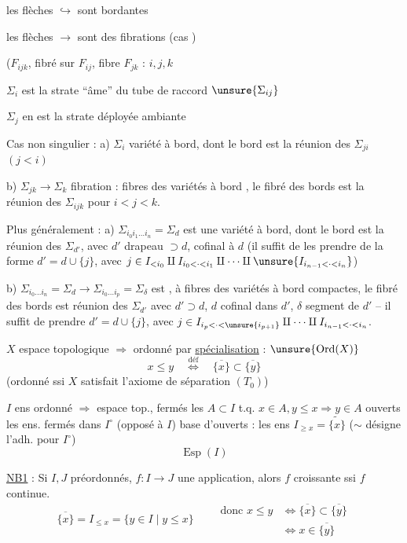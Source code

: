 les flèches $\hookrightarrow$ sont bordantes

les flèches $\longrightarrow$ sont des fibrations 
(cas )

($F_{ijk}$, fibré sur $F_{ij}$, fibre $F_{jk}$ : 
 $i,j,k$

$\Sigma_i$ est la strate  ``âme'' du tube de raccord $\unsure{\Sigma_{ij}}$

$\Sigma_j$ en est la strate déployée ambiante

Cas non singulier : a) $\Sigma_i$ variété à bord, dont le bord est
la réunion des $\Sigma_{ji}$ $(j<i)$

b) $\Sigma_{jk}\longrightarrow\Sigma_k$ fibration : fibres des
variétés à bord , le fibré des bords est
la réunion des $\Sigma_{ijk}$ pour $i<j<k$.

Plus généralement : a) $\Sigma_{i_0i_1\ldots i_n}=\Sigma_d$ est une
variété à bord, dont le bord est la réunion des
$\Sigma_{d'}$, avec $d'$ drapeau $\supset d$, cofinal à $d$
(il suffit de les prendre de la forme $d'=d\cup\{j\}$,
avec $j\in I_{<i_0}\amalg I_{i_0<\cdot<i_1}\amalg\cdots\amalg\unsure{I_{i_{n-1}<\cdot<i_n}}$)

b) $\Sigma_{i_0\ldots i_n}=\Sigma_d\longrightarrow\Sigma_{i_0\ldots i_p}=\Sigma_\delta$
est , à fibres des variétés à bord compactes,
le fibré des bords est réunion des $\Sigma_{d'}$
avec $d'\supset d$, $d$ cofinal dans $d'$, $\delta$ segment 
de $d'$ -- il suffit de prendre $d'=d\cup\{j\}$, avec
$j\in I_{i_p<\cdot<\unsure{i_{p+1}}}\amalg\cdots\amalg I_{i_{n-1}<\cdot<i_n}$.



$X$ espace topologique $\Longrightarrow$ ordonné par \uline{spécialisation} : $\unsure{\operatorname{Ord}(X)}$
\[
x\leq y\quad\overset{\mathrm{déf}}{\Longleftrightarrow}\quad\overline{\{x\}}\subset\overline{\{y\}}
\]
(ordonné ssi $X$ satisfait l'axiome de séparation $(T_0)$)

$I$ ens ordonné $\Longrightarrow$ espace top., fermés les $A\subset I$ t.q. $x\in A,y\leq x\Rightarrow y\in A$
ouverts les ens. fermés dans $I^\circ$ (opposé à $I$)
base d'ouverts : les ens $I_{\geq x}=\widetilde{\{x\}}$ ($\sim$ désigne l'adh. pour $I^\circ$)
\[
\operatorname{Esp}(I)
\]

\uline{NB1} : Si $I,J$ préordonnés, $f:I\longrightarrow J$
une application, alors $f$ croissante ssi
$f$ continue.
\[
\overline{\{x\}}=I_{\leq x}=\{y\in I\mid y\leq x\}\qquad
\begin{aligned}
\text{donc }x\leq y&\Longleftrightarrow\overline{\{x\}}\subset\overline{\{y\}}\\
&\Longleftrightarrow x\in\overline{\{y\}}
\end{aligned}
\]

